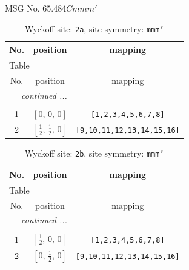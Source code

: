 \documentclass[fleqn,8pt]{jsarticle}
\begin{document}
\setcounter{MaxMatrixCols}{32}

\renewcommand{\tablename}{Table~}
\renewcommand{\figurename}{Figure~}
\begin{center}
\LARGE
MSG No. 65.484\quad$Cmmm'$
\end{center}
\renewcommand{\arraystretch}{1.2}
\begin{longtable}{ccc}
\caption{Wyckoff site: {\tt 2a}, site symmetry: {\tt mmm'}}
 \\
 \hline \hline
No. & position & mapping \\ \hline \endfirsthead

\multicolumn{2}{l}{\tablename\ \thetable{}} \\
 \hline \hline
No. & position & mapping \\ \hline \endhead

 \hline \hline
\multicolumn{2}{r}{\footnotesize\it continued ...} \\ \endfoot

 \hline \hline
\multicolumn{2}{r}{} \\ \endlastfoot

1 & $\left[ 0,\, 0,\, 0 \right]$ & {\tt [1,2,3,4,5,6,7,8]} \\ \hline
2 & $\left[ \frac{1}{2},\, \frac{1}{2},\, 0 \right]$ & {\tt [9,10,11,12,13,14,15,16]} \\
\end{longtable}
\renewcommand{\arraystretch}{1.2}
\begin{longtable}{ccc}
\caption{Wyckoff site: {\tt 2b}, site symmetry: {\tt mmm'}}
 \\
 \hline \hline
No. & position & mapping \\ \hline \endfirsthead

\multicolumn{2}{l}{\tablename\ \thetable{}} \\
 \hline \hline
No. & position & mapping \\ \hline \endhead

 \hline \hline
\multicolumn{2}{r}{\footnotesize\it continued ...} \\ \endfoot

 \hline \hline
\multicolumn{2}{r}{} \\ \endlastfoot

1 & $\left[ \frac{1}{2},\, 0,\, 0 \right]$ & {\tt [1,2,3,4,5,6,7,8]} \\ \hline
2 & $\left[ 0,\, \frac{1}{2},\, 0 \right]$ & {\tt [9,10,11,12,13,14,15,16]} \\
\end{longtable}
\end{document}
